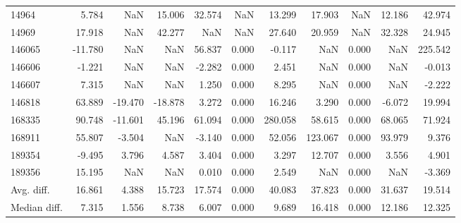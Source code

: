 \begin{tabular}{lrrrrrrrrrr}
14964 & 5.784 & NaN & 15.006 & 32.574 & NaN & 13.299 & 17.903 & NaN & 12.186 & 42.974 \\
14969 & 17.918 & NaN & 42.277 & NaN & NaN & 27.640 & 20.959 & NaN & 32.328 & 24.945 \\
146065 & -11.780 & NaN & NaN & 56.837 & 0.000 & -0.117 & NaN & 0.000 & NaN & 225.542 \\
146606 & -1.221 & NaN & NaN & -2.282 & 0.000 & 2.451 & NaN & 0.000 & NaN & -0.013 \\
146607 & 7.315 & NaN & NaN & 1.250 & 0.000 & 8.295 & NaN & 0.000 & NaN & -2.222 \\
146818 & 63.889 & -19.470 & -18.878 & 3.272 & 0.000 & 16.246 & 3.290 & 0.000 & -6.072 & 19.994 \\
168335 & 90.748 & -11.601 & 45.196 & 61.094 & 0.000 & 280.058 & 58.615 & 0.000 & 68.065 & 71.924 \\
168911 & 55.807 & -3.504 & NaN & -3.140 & 0.000 & 52.056 & 123.067 & 0.000 & 93.979 & 9.376 \\
189354 & -9.495 & 3.796 & 4.587 & 3.404 & 0.000 & 3.297 & 12.707 & 0.000 & 3.556 & 4.901 \\
189356 & 15.195 & NaN & NaN & 0.010 & 0.000 & 2.549 & NaN & 0.000 & NaN & -3.369 \\
Avg. diff. & 16.861 & 4.388 & 15.723 & 17.574 & 0.000 & 40.083 & 37.823 & 0.000 & 31.637 & 19.514 \\
Median diff. & 7.315 & 1.556 & 8.738 & 6.007 & 0.000 & 9.689 & 16.418 & 0.000 & 12.186 & 12.325 \\
\bottomrule
\end{tabular}
